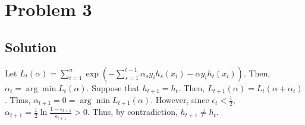 \documentclass[11pt]{report}
\begin{document}
\section*{Problem 3}
\subsection*{Solution}
Let $L_t(\alpha) = \sum_{i=1}^{n} \exp\left(-\sum_{s=1}^{t-1} \alpha_s y_i h_s(x_i) - \alpha y_i h_t(x_i)\right)$. Then, $\alpha_t = \arg\min L_t(\alpha)$. Suppose that $h_{t+1} = h_t$. Then, $L_{t+1}(\alpha) = L_t(\alpha +\alpha_t)$. Thus, $\alpha_{t+1} = 0 = \arg\min L_{t+1}(\alpha)$. However, since $\epsilon_t < \frac{1}{2}$, $\alpha_{t+1} = \frac{1}{2} \ln \frac{1-\epsilon_{t+1}}{\epsilon_{t+1}} > 0$. Thus, by contradiction, $h_{t+1} \neq h_t$.
\end{document}
